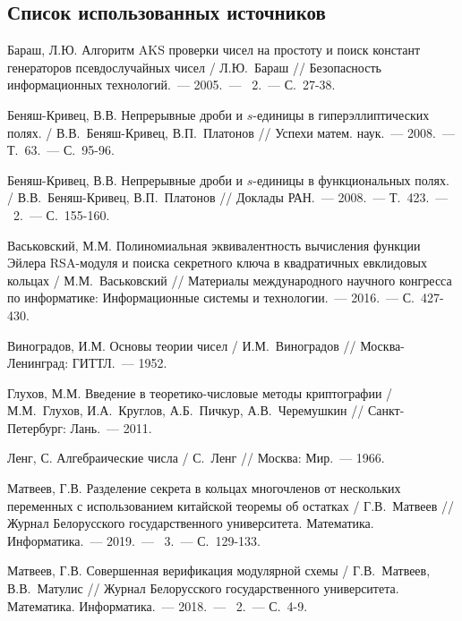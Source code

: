 \renewcommand{\bibname}{СПИСОК ИСПОЛЬЗОВАННЫХ ИСТОЧНИКОВ}

\begin{thebibliography}{99}
\section*{Список использованных источников}
\vspace{-12pt}

    Бараш, Л.Ю. Алгоритм AKS проверки чисел на простоту и поиск констант генераторов псевдослучайных чисел / Л.Ю.~Бараш // Безопасность информационных технологий.~--- 2005.~--- \textnumero~2.~--- С.~27-38.

    Беняш-Кривец, В.В. Непрерывные дроби и $s$-единицы в гиперэллиптических полях. / В.В.~Беняш-Кривец, В.П.~Платонов // Успехи матем. наук.~--- 2008.~--- Т.~63.~--- С.~95-96.
    
    Беняш-Кривец, В.В. Непрерывные дроби и $s$-единицы в функциональных полях. / В.В.~Беняш-Кривец, В.П.~Платонов // Доклады РАН.~--- 2008.~--- Т.~423.~--- \textnumero~2.~--- С.~155-160.

    Васьковский, М.М. Полиномиальная эквивалентность вычисления функции Эйлера RSA-модуля и поиска секретного ключа в квадратичных евклидовых кольцах / М.М.~Васьковский // Материалы международного научного конгресса по информатике: Информационные системы и технологии.~--- 2016.~--- С.~427-430.

    Виноградов, И.М. Основы теории чисел / И.М.~Виноградов // Москва-Ленинград: ГИТТЛ.~--- 1952.

    Глухов, М.М. Введение в теоретико-числовые методы криптографии / М.М.~Глухов, И.А.~Круглов, А.Б.~Пичкур, А.В.~Черемушкин // Санкт-Петербург: Лань.~--- 2011.

    Ленг, С. Алгебраические числа / С.~Ленг // Москва: Мир.~--- 1966.

    Матвеев, Г.В. Разделение секрета в кольцах многочленов от нескольких переменных с использованием китайской теоремы об остатках / Г.В.~Матвеев // Журнал Белорусского государственного университета. Математика. Информатика.~--- 2019.~--- \textnumero~3.~--- С.~129-133.
    
    Матвеев, Г.В. Совершенная верификация модулярной схемы / Г.В.~Матвеев, В.В.~Матулис // Журнал Белорусского государственного университета. Математика. Информатика.~--- 2018.~--- \textnumero~2.~--- С.~4-9.


\end{thebibliography}
